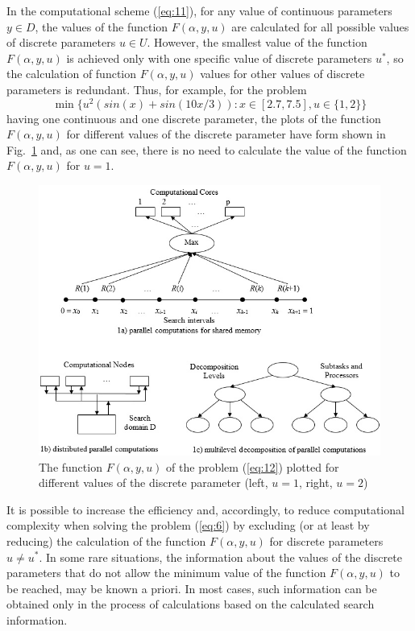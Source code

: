 \documentclass{svproc}
\begin{document}
In the computational scheme (\ref{eq:11}), for any value of continuous parameters $y \in D$, the values of the function $F(\alpha,y,u)$ are calculated for all possible values of discrete parameters $u \in U$. However, the smallest value of the function $F(\alpha,y,u)$ is achieved only with one specific value of discrete parameters $u^*$, so the calculation of function $F(\alpha,y,u)$ values for other values of discrete parameters is redundant. Thus, for example, for the problem
\begin{equation}\label{eq:12}
 \min\{u^2(sin(x)+sin(10x/3)):x\in[2.7,7.5],u\in \{1,2\}\}
\end{equation}
having one continuous and one discrete parameter, the plots of the  function $F(\alpha,y,u)$ for different values of the discrete parameter have form shown in Fig.~\ref{fig:1} and, as one can see, there is no need to calculate the value of the function $F(\alpha,y,u)$ for $u=1$.

\begin{figure}
  \centering
  \includegraphics[width=0.9\linewidth]{fig1}
  \caption{The function $F(\alpha,y,u)$ of the problem (\ref{eq:12}) plotted for different values of the discrete parameter (left, $u=1$,  right, $u=2$)}
  \label{fig:1}
\end{figure}


It is possible to increase the efficiency and, accordingly, to reduce computational complexity when solving  the problem (\ref{eq:6}) by excluding (or at least by reducing) the calculation of the function $F(\alpha,y,u)$ for discrete parameters $u \neq u^*$. In some rare situations, the information about the values of the discrete parameters that do not allow the minimum value of the function $F(\alpha,y,u)$ to be reached, may be known a priori. In most cases, such information can be obtained only in the process of calculations based on the calculated search information. 
\end{document}
